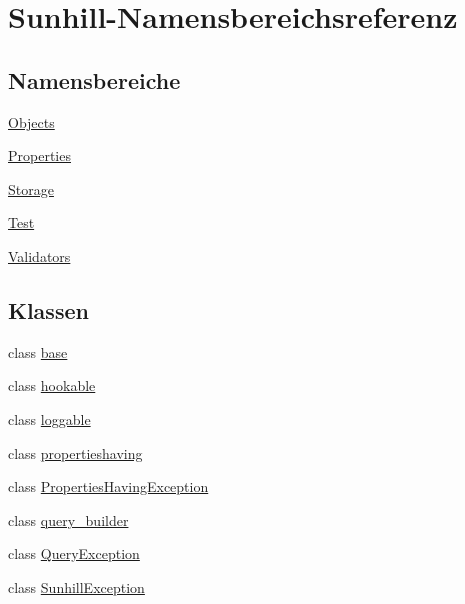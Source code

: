 \hypertarget{namespaceSunhill}{}\section{Sunhill-\/\+Namensbereichsreferenz}
\label{namespaceSunhill}
\subsection*{Namensbereiche}
\begin{DoxyCompactItemize}
\item 
 \hyperlink{namespaceSunhill_1_1Objects}{Objects}
\item 
 \hyperlink{namespaceSunhill_1_1Properties}{Properties}
\item 
 \hyperlink{namespaceSunhill_1_1Storage}{Storage}
\item 
 \hyperlink{namespaceSunhill_1_1Test}{Test}
\item 
 \hyperlink{namespaceSunhill_1_1Validators}{Validators}
\end{DoxyCompactItemize}
\subsection*{Klassen}
\begin{DoxyCompactItemize}
\item 
class \hyperlink{classSunhill_1_1base}{base}
\item 
class \hyperlink{classSunhill_1_1hookable}{hookable}
\item 
class \hyperlink{classSunhill_1_1loggable}{loggable}
\item 
class \hyperlink{classSunhill_1_1propertieshaving}{propertieshaving}
\item 
class \hyperlink{classSunhill_1_1PropertiesHavingException}{Properties\+Having\+Exception}
\item 
class \hyperlink{classSunhill_1_1query__builder}{query\+\_\+builder}
\item 
class \hyperlink{classSunhill_1_1QueryException}{Query\+Exception}
\item 
class \hyperlink{classSunhill_1_1SunhillException}{Sunhill\+Exception}
\end{DoxyCompactItemize}
